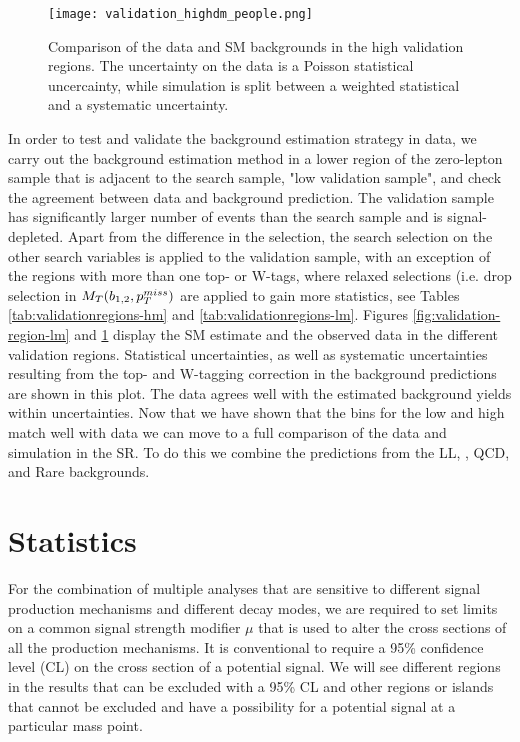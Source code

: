 \begin{figure}
	\begin{center}
  \texttt{[image: validation\_highdm\_people.png]}
	\end{center}
	\caption[Lost Lepton HM Control Region]{Comparison of the data and SM backgrounds in the high \dm{} validation regions. The uncertainty on the data is a Poisson statistical uncercainty, while simulation is split between a weighted statistical and a systematic uncertainty.
	 }
	\label{fig:validation-region-hm}
\end{figure}

In order to test and validate the background estimation strategy in data, we carry out the background estimation method in a lower \met{} region of the zero-lepton sample that is adjacent to the search sample, "low \met{} validation sample", and check the agreement between data and background prediction. The validation sample has significantly larger number of events than the search sample and is signal-depleted. Apart from the difference in the \met{} selection, the search selection on the other search variables is applied to the validation sample, with an exception of the regions with more than one top- or W-tags, where relaxed selections (i.e. drop selection in $M_T(b_{1,2},p_{T}^{miss})$ are applied to gain more statistics, see Tables \ref{tab:validationregions-hm} and \ref{tab:validationregions-lm}. Figures \ref{fig:validation-region-lm} and \ref{fig:validation-region-hm} display the SM estimate and the observed data in the different validation regions. Statistical uncertainties, as well as systematic uncertainties resulting from the top- and W-tagging correction in the background predictions are shown in this plot. The data agrees well with the estimated background yields within uncertainties. Now that we have shown that the bins for the low and high \dm{} match well with data we can move to a full comparison of the data and simulation in the SR. To do this we combine the predictions from the LL, \Znunu, QCD, and Rare backgrounds.

\section{Statistics}
\label{sec:Statistics}

For the combination of multiple analyses that are sensitive to different signal production mechanisms and different decay modes, we are required to set limits on a common signal strength modifier $\mu$ that is used to alter the cross sections of all the production mechanisms. It is conventional to require a 95\% confidence level (CL) on the cross section of a potential signal. We will see different regions in the results that can be excluded with a 95\% CL and other regions or islands that cannot be excluded and have a possibility for a potential signal at a particular mass point. 

